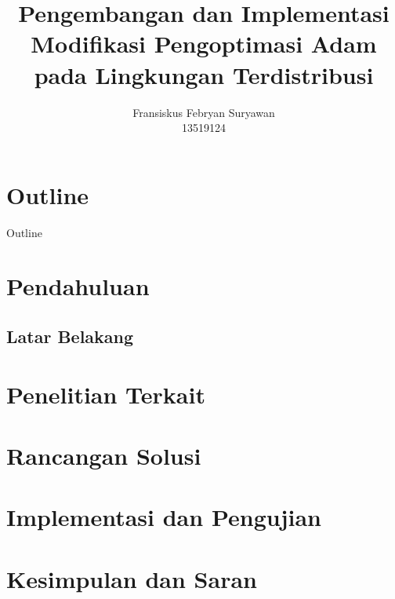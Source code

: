 \documentclass[aspectratio=169]{beamer}
\title[Modifikasi Adam]{Pengembangan dan Implementasi Modifikasi Pengoptimasi Adam pada Lingkungan Terdistribusi}
\author[]{
  Fransiskus Febryan Suryawan\\
  13519124
}
\institute{Institut Teknologi Bandung}
\date{}
\begin{document}


\section*{Outline}
\begin{frame}{Outline}
  \begin{center}
    \begin{multicols}{2}
      \tableofcontents
    \end{multicols}
  \end{center}
\end{frame}

\section{Pendahuluan}
\subsection{Latar Belakang}





\section{Penelitian Terkait}



\section{Rancangan Solusi}


\section{Implementasi dan Pengujian}







\section{Kesimpulan dan Saran}


\end{document}
